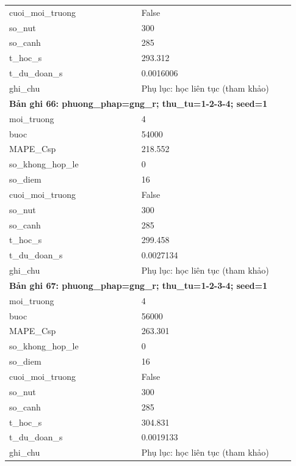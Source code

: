 \begin{longtable}{p{0.43\linewidth}p{0.50\linewidth}}
cuoi\_\allowbreak moi\_\allowbreak truong & False \\
so\_\allowbreak nut & 300 \\
so\_\allowbreak canh & 285 \\
t\_\allowbreak hoc\_\allowbreak s & 293.312 \\
t\_\allowbreak du\_\allowbreak doan\_\allowbreak s & 0.0016006 \\
ghi\_\allowbreak chu & Phụ lục: học liên tục (tham khảo) \\
\midrule
\multicolumn{2}{p{0.95\linewidth}}{\textbf{Bản ghi 66: phuong\_phap=gng\_r; thu\_tu=1-2-3-4; seed=1}} \\
moi\_\allowbreak truong & 4 \\
buoc & 54000 \\
MAPE\_\allowbreak Csp & 218.552 \\
so\_\allowbreak khong\_\allowbreak hop\_\allowbreak le & 0 \\
so\_\allowbreak diem & 16 \\
cuoi\_\allowbreak moi\_\allowbreak truong & False \\
so\_\allowbreak nut & 300 \\
so\_\allowbreak canh & 285 \\
t\_\allowbreak hoc\_\allowbreak s & 299.458 \\
t\_\allowbreak du\_\allowbreak doan\_\allowbreak s & 0.0027134 \\
ghi\_\allowbreak chu & Phụ lục: học liên tục (tham khảo) \\
\midrule
\multicolumn{2}{p{0.95\linewidth}}{\textbf{Bản ghi 67: phuong\_phap=gng\_r; thu\_tu=1-2-3-4; seed=1}} \\
moi\_\allowbreak truong & 4 \\
buoc & 56000 \\
MAPE\_\allowbreak Csp & 263.301 \\
so\_\allowbreak khong\_\allowbreak hop\_\allowbreak le & 0 \\
so\_\allowbreak diem & 16 \\
cuoi\_\allowbreak moi\_\allowbreak truong & False \\
so\_\allowbreak nut & 300 \\
so\_\allowbreak canh & 285 \\
t\_\allowbreak hoc\_\allowbreak s & 304.831 \\
t\_\allowbreak du\_\allowbreak doan\_\allowbreak s & 0.0019133 \\
ghi\_\allowbreak chu & Phụ lục: học liên tục (tham khảo) \\

\end{longtable}
